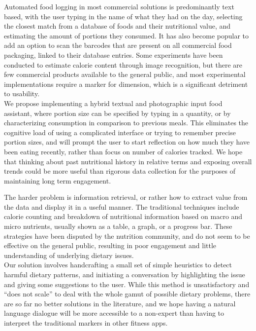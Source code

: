 Automated food logging in most commercial solutions is predominantly text based, with the user typing in the name of what they had on the day, selecting the closest match from a database of foods and their nutritional value, and estimating the amount of portions they consumed. It has also become popular to add an option to scan the barcodes that are present on all commercial food packaging, linked to their database entries. Some experiments have been conducted to estimate calorie content through image recognition, but there are few commercial products available to the general public, and most experimental implementations require a marker for dimension, which is a significant detriment to usability. \\
We propose implementing a hybrid textual and photographic input food assistant, where portion size can be specified by typing in a quantity, or by characterizing consumption in comparison to previous meals. This eliminates the cognitive load of using a complicated interface or trying to remember precise portion sizes, and will prompt the user to start reflection on how much they have been eating recently, rather than focus on number of calories tracked. We hope that thinking about past nutritional history in relative terms and exposing overall trends could be more useful than rigorous data collection for the purposes of maintaining long term engagement.

The harder problem is information retrieval, or rather how to extract value from the data and display it in a useful manner. The traditional techniques include calorie counting and breakdown of nutritional information based on macro and micro nutrients, usually shown as a table, a graph, or a progress bar. These strategies have been disputed by the nutrition community, and do not seem to be effective on the general public, resulting in poor engagement and little understanding of underlying dietary issues. \\
Our solution involves handcrafting a small set of simple heuristics to detect harmful dietary patterns, and initiating a conversation by highlighting the issue and giving some suggestions to the user. While this method is unsatisfactory and ``does not scale'' to deal with the whole gamut of possible dietary problems, there are so far no better solutions in the literature, and we hope having a natural language dialogue will be more accessible to a non-expert than having to interpret the traditional markers in other fitness apps. 

